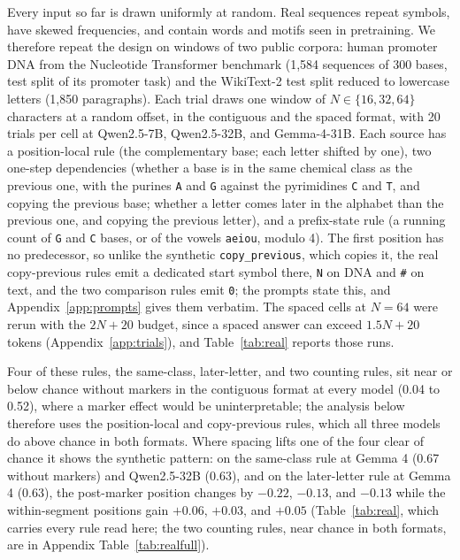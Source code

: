 \documentclass[10pt]{article} %
\newcommand{\task}[1]{\texttt{#1}}
\begin{document}
Every input so far is drawn uniformly at random. Real sequences repeat symbols, have skewed frequencies, and contain words and motifs seen in pretraining. We therefore repeat the design on windows of two public corpora: human promoter DNA from the Nucleotide Transformer benchmark \citep{dallatorre2025nucleotide} (1,584 sequences of 300 bases, test split of its promoter task) and the WikiText-2 test split \citep{merity2017wikitext} reduced to lowercase letters (1,850 paragraphs). Each trial draws one window of $N \in \{16, 32, 64\}$ characters at a random offset, in the contiguous and the spaced format, with 20 trials per cell at Qwen2.5-7B, Qwen2.5-32B, and Gemma-4-31B. Each source has a position-local rule (the complementary base; each letter shifted by one), two one-step dependencies (whether a base is in the same chemical class as the previous one, with the purines \texttt{A} and \texttt{G} against the pyrimidines \texttt{C} and \texttt{T}, and copying the previous base; whether a letter comes later in the alphabet than the previous one, and copying the previous letter), and a prefix-state rule (a running count of \texttt{G} and \texttt{C} bases, or of the vowels \texttt{aeiou}, modulo 4). The first position has no predecessor, so unlike the synthetic \task{copy\_previous}, which copies it, the real copy-previous rules emit a dedicated start symbol there, \texttt{N} on DNA and \texttt{\#} on text, and the two comparison rules emit \texttt{0}; the prompts state this, and Appendix~\ref{app:prompts} gives them verbatim. The spaced cells at $N = 64$ were rerun with the $2N + 20$ budget, since a spaced answer can exceed $1.5N + 20$ tokens (Appendix~\ref{app:trials}), and Table~\ref{tab:real} reports those runs.

Four of these rules, the same-class, later-letter, and two counting rules, sit near or below chance without markers in the contiguous format at every model (0.04 to 0.52), where a marker effect would be uninterpretable; the analysis below therefore uses the position-local and copy-previous rules, which all three models do above chance in both formats. Where spacing lifts one of the four clear of chance it shows the synthetic pattern: on the same-class rule at Gemma 4 (0.67 without markers) and Qwen2.5-32B (0.63), and on the later-letter rule at Gemma 4 (0.63), the post-marker position changes by $-0.22$, $-0.13$, and $-0.13$ while the within-segment positions gain $+0.06$, $+0.03$, and $+0.05$ (Table~\ref{tab:real}, which carries every rule read here; the two counting rules, near chance in both formats, are in Appendix Table~\ref{tab:realfull}).
\end{document}
